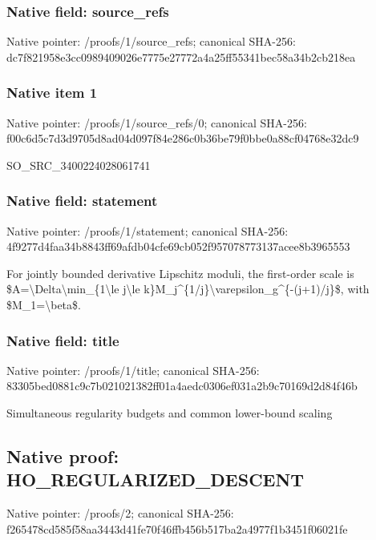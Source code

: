 \documentclass[10pt,a4paper]{article}
\begin{document}
\subsubsection{Native field: source\_\allowbreak{}refs}
Native pointer: /proofs/1/source\_\allowbreak{}refs; canonical SHA-256: dc7f821958e3cc0989409026e7775e27772a4a25ff55341bec58a34b2cb218ea

\subsubsection{Native item 1}
Native pointer: /proofs/1/source\_\allowbreak{}refs/0; canonical SHA-256: f00c6d5c7d3d9705d8ad04d097f84e286c0b36be79f0bbe0a88cf04768e32dc9

\begingroup\raggedright\sloppy SO\_\allowbreak{}SRC\_\allowbreak{}3400224028061741\par\endgroup

\subsubsection{Native field: statement}
Native pointer: /proofs/1/statement; canonical SHA-256: 4f9277d4faa34b8843ff69afdb04cfe69cb052f957078773137acee8b3965553

\begingroup\raggedright\sloppy For jointly bounded derivative Lipschitz moduli,\allowbreak{} the first-order scale is \$A=\allowbreak{}\textbackslash{}Delta\textbackslash{}min\_\allowbreak{}\{1\textbackslash{}le j\textbackslash{}le k\}M\_\allowbreak{}j\textasciicircum{}\{1/\allowbreak{}j\}\textbackslash{}varepsilon\_\allowbreak{}g\textasciicircum{}\{-(j+1)/\allowbreak{}j\}\$,\allowbreak{} with \$M\_\allowbreak{}1=\allowbreak{}\textbackslash{}beta\$.\par\endgroup

\subsubsection{Native field: title}
Native pointer: /proofs/1/title; canonical SHA-256: 83305bed0881c9c7b021021382ff01a4aedc0306ef031a2b9c70169d2d84f46b

\begingroup\raggedright\sloppy Simultaneous regularity budgets and common lower-bound scaling\par\endgroup

\subsection{Native proof: HO\_\allowbreak{}REGULARIZED\_\allowbreak{}DESCENT}
Native pointer: /proofs/2; canonical SHA-256: f265478cd585f58aa3443d41fe70f46ffb456b517ba2a4977f1b3451f06021fe
\end{document}
